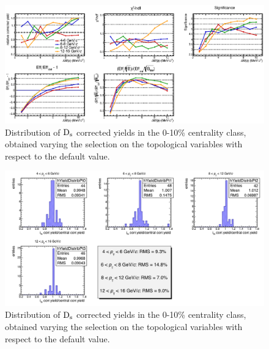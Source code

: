 \begin{figure}[!h]
 \begin{center}
   \includegraphics[angle=0, width=15cm]{./FigCap5/cutbycut_invm_010.eps}
 \end{center}
 \caption{Distribution of ${\rm D_s}$ corrected yields in the 0-10\% centrality class, obtained varying the selection on the topological variables with respect to the default value.}
 \label{DsCutVar_010} 
\end{figure}
\begin{figure}[!h]
 \begin{center}
   \includegraphics[angle=0, width=15cm]{./FigCap5/FinalSyst_010.png}
 \end{center}
 \caption{Distribution of ${\rm D_s}$ corrected yields in the 0-10\% centrality class, obtained varying the selection on the topological variables with respect to the default value.}
 \label{fig:DsCutVar_010} 
\end{figure}


